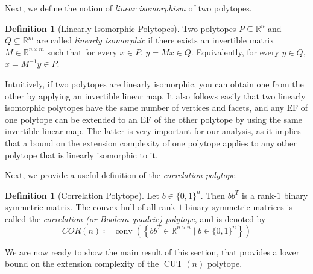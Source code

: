 \documentclass{article}
\theoremstyle{definition}
\newtheorem{definition}[theorem]{Definition}
\theoremstyle{remark}
\newcommand{\conv}{\operatorname{conv}}
\newcommand{\CUT}{\operatorname{CUT}}
\renewcommand{\R}{\mathbb{R}}
\begin{document}
Next, we define the notion of \textit{linear isomorphism} of two polytopes.

\begin{definition}[Linearly Isomorphic Polytopes]\label{def:lin-iso}
Two polytopes $P \subseteq \R^n$ and $Q \subseteq \R^m$ are called \textit{linearly isomorphic} if there exists an invertible matrix $M \in \R^{n \times m}$ such that for every $x \in P$, $y = Mx \in Q$. Equivalently, for every $y \in Q$, $x = M^{-1}y \in P$.
\end{definition}

Intuitively, if two polytopes are linearly isomorphic, you can obtain one from the other by applying an invertible linear map. It also follows easily that two linearly isomorphic polytopes have the same number of vertices and facets, and any EF of one polytope can be extended to an EF of the other polytope by using the same invertible linear map. The latter is very important for our analysis, as it implies that a bound on the extension complexity of one polytope applies to any other polytope that is linearly isomorphic to it.

Next, we provide a useful definition of the \textit{correlation polytope}.

\begin{definition}[Correlation Polytope]\label{def:cor}
Let $b \in {\{0, 1\}}^n$. Then $b b^T$ is a rank-$1$ binary symmetric matrix. The convex hull of all rank-$1$ binary symmetric matrices is called
the \textit{correlation (or Boolean quadric) polytope}, and is denoted by
\[
COR(n) \coloneqq \conv\left( \left\{ bb^T \in \R^{n \times n} \mid b \in {\{0, 1\}}^n \right\} \right)
\]
\end{definition}

We are now ready to show the main result of this section, that provides a lower bound on the extension complexity of the $\CUT(n)$ polytope.
\end{document}
